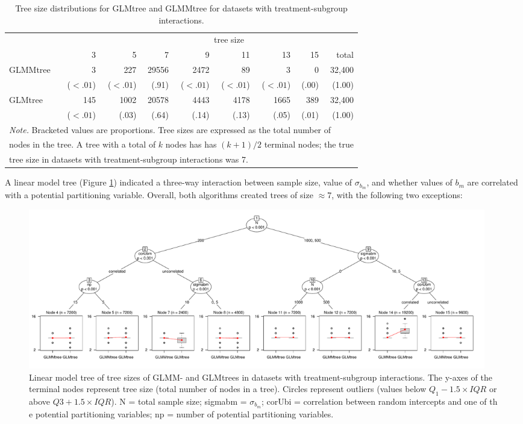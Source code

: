 \documentclass[nobf,doc]{apa}
\begin{document}
\begin{table}[!htbp]
\caption{Tree size distributions for GLMtree and GLMMtree for datasets with treatment-subgroup interactions.}
\small
\begin{tabular}{lrrrrrrrr}
	\thickline
	&&\multicolumn{7}{c}{tree size}\\
	\cline{2-8}
	&     3   &   5   &   7   &   9   &  11  &   13   &   15  & total \\
	\hline
  	GLMMtree	& 3 & 227& 29556 & 2472 & 89 & 3 &0& 32,400 \\
				&  ($<.01$)  & ($<.01$)& (.91) & ($<.01$) & ($<.01$) & ($<.01$) &(.00)& (1.00) \\

  	GLMtree		& 145 & 1002 & 20578 & 4443 & 4178 & 1665 & 389 & 32,400\\ 
 			 	& ($<.01$) & (.03) & (.64) & (.14) & (.13) & (.05) & (.01) & (1.00) \\ 
	\hline
  	\multicolumn{9}{l}{\textit{Note. } Bracketed values are proportions. Tree sizes are expressed as the total number of}\\
  	\multicolumn{9}{l}{nodes in the tree. A tree with a total of $k$ nodes has has $(k+1)/2$ terminal nodes; the true}\\	
  	\multicolumn{8}{l}{tree size in datasets with treatment-subgroup interactions was 7.}\\
\end{tabular}
\label{tab:treesize_interactions}
\end{table}
 
A linear model tree (Figure \ref{fig:treesizetree_interact}) indicated a three-way interaction between sample size, value of $\sigma_{b_m}$, and whether values of $b_m$ are correlated with a potential partitioning variable. Overall, both algorithms created trees of size $\approx 7$, with the following two exceptions:


\begin{figure}
	\includegraphics[width=20cm]{treesize_mob_maxdepth=4.pdf}
	\caption{Linear model tree of tree sizes of GLMM- and GLMtrees in datasets with treatment-subgroup interactions. The y-axes of the terminal nodes represent tree size (total number of nodes in a tree). Circles represent outliers (values below $Q_1 - 1.5 \times IQR$ or above $Q3 + 1.5 \times IQR$). N = total sample size; sigmabm = $\sigma_{b_m}$; corUbi = correlation between random intercepts and one of th e potential partitioning variables; np = number of potential partitioning variables.}
	\label{fig:treesizetree_interact}
\end{figure}
\end{document}
